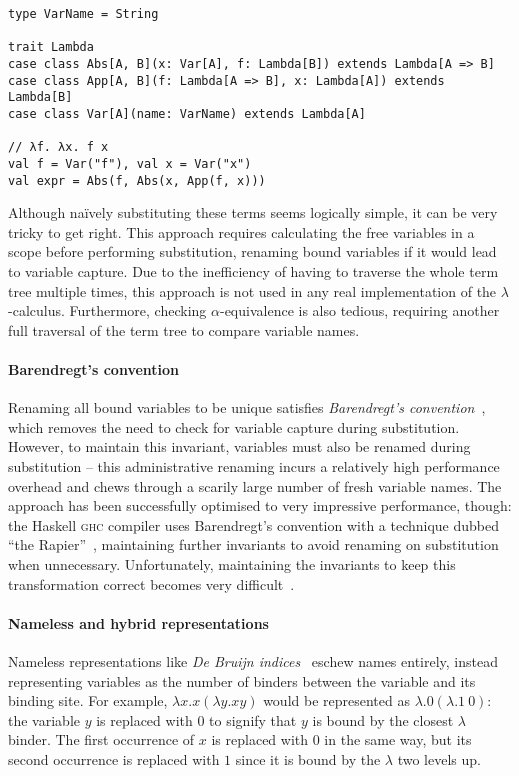 \documentclass[../../../main.tex]{subfiles}
\begin{document}
\begin{verbatim}
type VarName = String

trait Lambda
case class Abs[A, B](x: Var[A], f: Lambda[B]) extends Lambda[A => B]
case class App[A, B](f: Lambda[A => B], x: Lambda[A]) extends Lambda[B]
case class Var[A](name: VarName) extends Lambda[A]

// λf. λx. f x
val f = Var("f"), val x = Var("x")
val expr = Abs(f, Abs(x, App(f, x)))
\end{verbatim}
%
Although naïvely substituting these terms seems logically simple, it can be very tricky to get right.
This approach requires calculating the free variables in a scope before performing substitution, renaming bound variables if it would lead to variable capture.
Due to the inefficiency of having to traverse the whole term tree multiple times, this approach is not used in any real implementation of the $\lambda$-calculus.
Furthermore, checking $\alpha$-equivalence is also tedious, requiring another full traversal of the term tree to compare variable names.

\paragraph{Barendregt's convention}
Renaming all bound variables to be unique satisfies \emph{Barendregt's convention}~\cite{barendregt_lambda_1984}, which removes the need to check for variable capture during substitution.
However, to maintain this invariant, variables must also be renamed during substitution -- this administrative renaming incurs a relatively high performance overhead and chews through a scarily large number of fresh variable names.
The approach has been successfully optimised to very impressive performance, though:
the Haskell \textsc{ghc} compiler uses Barendregt's convention with a technique dubbed ``the Rapier''~\cite{peytonjones_secrets_2002}, maintaining further invariants to avoid renaming on substitution when unnecessary.
Unfortunately, maintaining the invariants to keep this transformation correct becomes very difficult~\cite{maclaurin_thefoil_2023}.

\paragraph{Nameless and hybrid representations}
Nameless representations like \emph{De Bruijn indices}~\cite{debruijn_lambda_1972} eschew names entirely, instead representing variables as the number of binders between the variable and its binding site.
For example, $\lambda x. x(\lambda y. x y)$ would be represented as $\lambda. 0(\lambda. 1\ 0)$: the variable $y$ is replaced with $0$ to signify that $y$ is bound by the closest $\lambda$ binder.
The first occurrence of $x$ is replaced with $0$ in the same way, but its second occurrence is replaced with $1$ since it is bound by the $\lambda$ two levels up.
\end{document}
